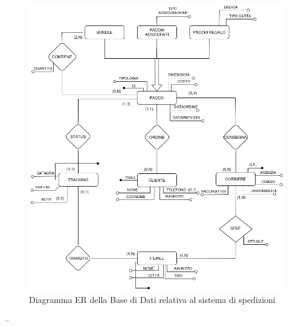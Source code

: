 \begin{figure}[H]
\centering
\includegraphics[width=1.0\textwidth]{Resources/ER.png}
\caption{Diagramma ER della Base di Dati relativa al sistema di spedizioni}
\label{ER}
\end{figure}
– 